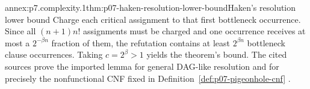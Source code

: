 \begin{annexitem}{annex:p7.complexity.1}{thm:p07-haken-resolution-lower-bound}{Haken's resolution lower bound}
Charge each critical assignment to that first bottleneck occurrence.  Since
all \((n+1)n!\) assignments must be charged and one occurrence receives at
most a \(2^{-\beta n}\) fraction of them, the refutation contains at least
\(2^{\beta n}\) bottleneck clause occurrences.  Taking \(c=2^{\beta}>1\)
yields the theorem's bound.  The cited sources prove the imported lemma for
general DAG-like resolution and for precisely the nonfunctional CNF fixed in
Definition~\ref{def:p07-pigeonhole-cnf}
\cite{Haken1985,BeamePitassi1998}.
\end{annexitem}
